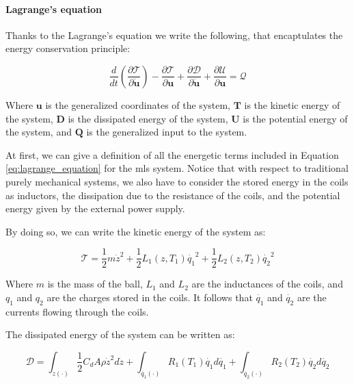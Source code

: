 \paragraph{Lagrange's equation}

Thanks to the Lagrange's equation we write the following, that encaptulates the energy conservation principle:

\begin{equation}
    \frac{d}{dt} \left( \frac{\partial \mathcal{T}}{\partial \dot{\mathbf{u}}} \right) - \frac{\partial \mathcal{T}}{\partial \mathbf{u}} + \frac{\partial \mathcal{D}}{\partial \dot{\mathbf{u}}} + \frac{\partial \mathcal{U}}{\partial \mathbf{u}} = \mathcal{Q}
    \label{eq:lagrange_equation}
\end{equation}

Where $\mathbf{u}$ is the generalized coordinates of the system, $\mathbf{T}$ is the kinetic energy of the system, $\mathbf{D}$ is the dissipated energy of the system, $\mathbf{U}$ is the potential energy of the system, and $\mathbf{Q}$ is the generalized input to the system.

At first, we can give a definition of all the energetic terms included in Equation \ref{eq:lagrange_equation} for the \acrshort{mls} system.
Notice that with respect to traditional purely mechanical systems, we also have to consider the stored energy in the coils as inductors, the dissipation due to the resistance of the coils, and the potential energy given by the external power supply.

By doing so, we can write the kinetic energy of the system as:

\begin{equation}
    \mathcal{T} = \frac{1}{2} m \dot{z}^2 + \frac{1}{2} L_1(z, T_1) \dot{q_1}^2 + \frac{1}{2} L_2(z, T_2) \dot{q_2}^2
    \label{eq:kinetic_energy}
\end{equation}

Where $m$ is the mass of the ball, $L_1$ and $L_2$ are the inductances of the coils, and $q_1$ and $q_2$ are the charges stored in the coils.
It follows that $\dot{q_1}$ and $\dot{q_2}$ are the currents flowing through the coils.

The dissipated energy of the system can be written as:

\begin{equation}
    \mathcal{D} = \int_{\dot{z}(\cdot)} \frac{1}{2} C_d A \rho \dot{z}^2 d\dot{z} + \int_{\dot{q_1}(\cdot)} R_1(T_1) \dot{q_1} d\dot{q_1} + \int_{\dot{q_2}(\cdot)} R_2(T_2) \dot{q_2} d\dot{q_2}
    \label{eq:dissipated_energy}
\end{equation}

